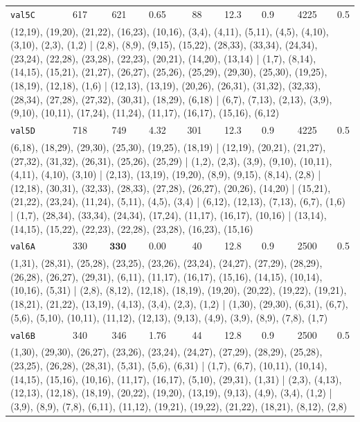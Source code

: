 \begin{landscape}
\begin{longtable}{lrrrrrrrr}
\texttt{val5C} & 617 & 621 & 0.65 & 88 & 12.3 & 0.9 & 4225 & 0.5 \\
\multicolumn{9}{p{0.96\linewidth}}{\tiny\raggedright\arraybackslash (12,19), (19,20), (21,22), (16,23), (10,16), (3,4), (4,11), (5,11), (4,5), (4,10), (3,10), (2,3), (1,2) | (2,8), (8,9), (9,15), (15,22), (28,33), (33,34), (24,34), (23,24), (22,28), (23,28), (22,23), (20,21), (14,20), (13,14) | (1,7), (8,14), (14,15), (15,21), (21,27), (26,27), (25,26), (25,29), (29,30), (25,30), (19,25), (18,19), (12,18), (1,6) | (12,13), (13,19), (20,26), (26,31), (31,32), (32,33), (28,34), (27,28), (27,32), (30,31), (18,29), (6,18) | (6,7), (7,13), (2,13), (3,9), (9,10), (10,11), (17,24), (11,24), (11,17), (16,17), (15,16), (6,12)} \\[2pt]
\texttt{val5D} & 718 & 749 & 4.32 & 301 & 12.3 & 0.9 & 4225 & 0.5 \\
\multicolumn{9}{p{0.96\linewidth}}{\tiny\raggedright\arraybackslash (6,18), (18,29), (29,30), (25,30), (19,25), (18,19) | (12,19), (20,21), (21,27), (27,32), (31,32), (26,31), (25,26), (25,29) | (1,2), (2,3), (3,9), (9,10), (10,11), (4,11), (4,10), (3,10) | (2,13), (13,19), (19,20), (8,9), (9,15), (8,14), (2,8) | (12,18), (30,31), (32,33), (28,33), (27,28), (26,27), (20,26), (14,20) | (15,21), (21,22), (23,24), (11,24), (5,11), (4,5), (3,4) | (6,12), (12,13), (7,13), (6,7), (1,6) | (1,7), (28,34), (33,34), (24,34), (17,24), (11,17), (16,17), (10,16) | (13,14), (14,15), (15,22), (22,23), (22,28), (23,28), (16,23), (15,16)} \\[2pt]
\texttt{val6A} & 330 & $\mathbf{330}$ & 0.00 & 40 & 12.8 & 0.9 & 2500 & 0.5 \\
\multicolumn{9}{p{0.96\linewidth}}{\tiny\raggedright\arraybackslash (1,31), (28,31), (25,28), (23,25), (23,26), (23,24), (24,27), (27,29), (28,29), (26,28), (26,27), (29,31), (6,11), (11,17), (16,17), (15,16), (14,15), (10,14), (10,16), (5,31) | (2,8), (8,12), (12,18), (18,19), (19,20), (20,22), (19,22), (19,21), (18,21), (21,22), (13,19), (4,13), (3,4), (2,3), (1,2) | (1,30), (29,30), (6,31), (6,7), (5,6), (5,10), (10,11), (11,12), (12,13), (9,13), (4,9), (3,9), (8,9), (7,8), (1,7)} \\[2pt]
\texttt{val6B} & 340 & 346 & 1.76 & 44 & 12.8 & 0.9 & 2500 & 0.5 \\
\multicolumn{9}{p{0.96\linewidth}}{\tiny\raggedright\arraybackslash (1,30), (29,30), (26,27), (23,26), (23,24), (24,27), (27,29), (28,29), (25,28), (23,25), (26,28), (28,31), (5,31), (5,6), (6,31) | (1,7), (6,7), (10,11), (10,14), (14,15), (15,16), (10,16), (11,17), (16,17), (5,10), (29,31), (1,31) | (2,3), (4,13), (12,13), (12,18), (18,19), (20,22), (19,20), (13,19), (9,13), (4,9), (3,4), (1,2) | (3,9), (8,9), (7,8), (6,11), (11,12), (19,21), (19,22), (21,22), (18,21), (8,12), (2,8)} \\[2pt]

\end{longtable}
\end{landscape}

